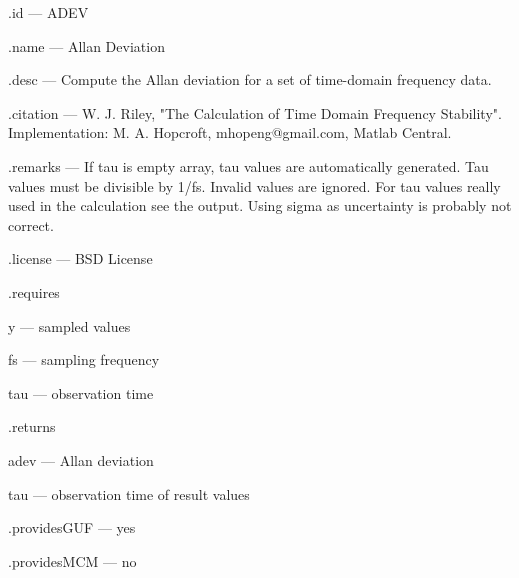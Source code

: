 \begin{tightdesc}
\item [\textsf{.id}] --- ADEV
\item [\textsf{.name}] --- Allan Deviation
\item [\textsf{.desc}] --- Compute the Allan deviation for a set of time-domain frequency data.
\item [\textsf{.citation}] --- W. J. Riley, "The Calculation of Time Domain Frequency Stability". Implementation: M. A. Hopcroft, mhopeng@gmail.com, Matlab Central.
\item [\textsf{.remarks}] --- If tau is empty array, tau values are automatically generated. Tau values must be divisible by 1/fs. Invalid values are ignored. For tau values really used in the calculation see the output. Using sigma as uncertainty is probably not correct.
\item [\textsf{.license}] --- BSD License
\item [\textsf{.requires}] \rule{0em}{0em}
\begin{tightdesc}
\item [\textsf{y}] --- sampled values
\item [\textsf{fs}] --- sampling frequency
\item [\textsf{tau}] --- observation time
\end{tightdesc}
\item [\textsf{.returns}] \rule{0em}{0em}
\begin{tightdesc}
\item [\textsf{adev}] --- Allan deviation
\item [\textsf{tau}] --- observation time of result values
\end{tightdesc}
\item [\textsf{.providesGUF}] --- yes
\item [\textsf{.providesMCM}] ---  no
\end{tightdesc}
